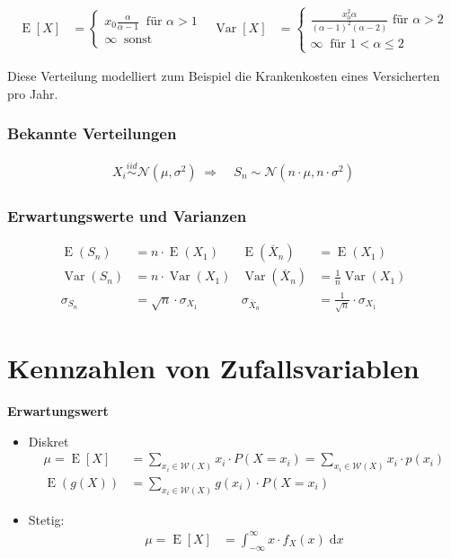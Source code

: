 \documentclass[25pt]{sciposter}
\newcommand{\Var}{\operatorname{Var}}
\newcommand{\E}{\operatorname{E}}
\newcommand{\mc}{\mathcal}
\newcommand{\rmd}{\mathrm{d}}
\newenvironment{method}[1]{\begin{mdframed}[backgroundcolor=blue!10,innertopmargin=15pt, innerbottommargin=15pt,nobreak=true]
		\textbf{#1 }
	}
	{ 
	\end{mdframed}
}
\begin{document}
\begin{multicols}{3}
		\begin{align*}
			\E[X] &= \begin{cases}
				x_0 \frac{\alpha}{\alpha - 1}\ \text{ für } \alpha > 1 \\
				\infty \ \text{ sonst}
			\end{cases}
			& 
			\Var[X] &= \begin{cases}
				\frac{x_0 ^2 \alpha}{(\alpha-1)^2(\alpha-2)} \text{ für } \alpha > 2\\
				\infty \ \text{ für } 1 < \alpha \leq 2
			\end{cases}
		\end{align*}
		
		Diese Verteilung modelliert zum Beispiel die Krankenkosten eines Versicherten pro Jahr.
		
		
		\subsubsection*{Bekannte Verteilungen}
		\begin{align*}
			X_i \overset{iid}{\sim} \mc N(\mu, \sigma^2) \; \Rightarrow & \; S_n \sim \mc N(n \cdot \mu, n \cdot \sigma^2)
		\end{align*}
		\subsubsection*{Erwartungswerte und Varianzen}
		\begin{align*}
			\E(S_n) &= n \cdot \E(X_1) & \E(\overline{X}_n) &= \E(X_1) \\
			\Var(S_n) &= n \cdot \Var(X_1) & \Var(\overline{X}_n) &= \tfrac{1}{n} \Var(X_1) \\
			\sigma_{S_n} &= \sqrt{n} \cdot \sigma_{X_1} & \sigma_{\overline{X}_n} &= \tfrac{1}{\sqrt{n}} \cdot \sigma_{X_1}
		\end{align*}
		
		
		
		\section{Kennzahlen von Zufallsvariablen}
		
		
		\begin{method}{Erwartungswert}
			\begin{itemize}
				\item Diskret
				\begin{align*}
					\mu = \E[X] &= \sum_{x_i \in \mathcal{W}(X)} x_i \cdot P(X=x_i) = \sum_{x_i \in \mathcal{W}(X)} x_i \cdot p(x_i) \\
					\E(g(X)) &= \sum_{x_i \in \mathcal{W}(X)} g(x_i) \cdot P(X=x_i)
				\end{align*}
				\item Stetig:
				\begin{align*}
					\mu = \E[X] &= \int_{-\infty}^{\infty} x \cdot f_X(x) \; \rmd x
				\end{align*}
				

\end{itemize}
\end{method}
\end{multicols}
\end{document}
